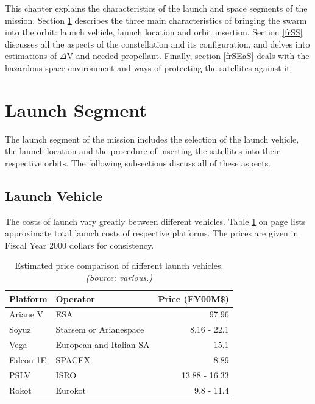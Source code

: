 This chapter explains the characteristics of the launch and space segments of the mission. Section \ref{frLS} describes the three main characteristics of bringing the swarm into the orbit: launch vehicle, launch location and orbit insertion. Section \ref{frSS} discusses all the aspects of the constellation and its configuration, and delves into estimations of $\Delta$V and needed propellant. Finally, section \ref{frSEaS} deals with the hazardous space environment and ways of protecting the satellites against it. 

\section{Launch Segment}
\label{frLS}

The launch segment of the mission includes the selection of the launch vehicle, the launch location and the procedure of inserting the satellites into their respective orbits. The following subsections discuss all of these aspects. 

\subsection{Launch Vehicle}
\label{frLSLV}

The costs of launch vary greatly between different vehicles. Table \ref{table:vehicleCosts} on page \pageref{table:vehicleCosts} lists approximate total launch costs of respective platforms. The prices are given in Fiscal Year 2000 dollars for consistency.
\begin{table}[h]
\begin{centering}
\begin{tabular}{llr}
\toprule
Platform & Operator & Price (FY00M\$) \\
\hline \hline
Ariane V  & ESA & 97.96 \\
Soyuz   & Starsem or Arianespace&  8.16 - 22.1 \\
Vega   & European and Italian SA  & 15.1 \\
Falcon 1E  & SPACEX  & 8.89 \\
PSLV & ISRO & 13.88 - 16.33 \\
Rokot & Eurokot & 9.8 - 11.4 \\
\bottomrule
\end{tabular}
\caption{Estimated price comparison of different launch vehicles. \emph{(Source: various.)}}
\label{table:vehicleCosts}
\end{centering}
\end{table}

